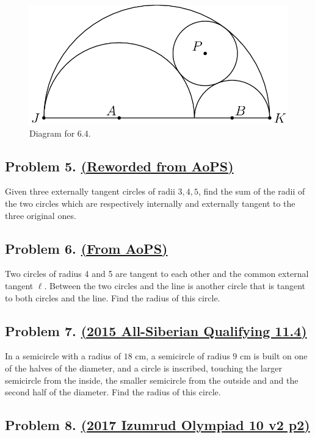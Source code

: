 \documentclass{article}
\begin{document}
\begin{figure}[ht]
\centering
\includegraphics[width=.5\textwidth]{6.4.png}
\caption{Diagram for 6.4.}
\end{figure}


\subsection{Problem 5. \href{https://artofproblemsolving.com/community/c4h1515721}{(Reworded from AoPS)}}

Given three externally tangent circles of radii $3,4,5$, find the sum of the radii of the two circles which are respectively internally and externally tangent to the three original ones.

\subsection{Problem 6. \href{https://artofproblemsolving.com/community/c4h396448}{(From AoPS)}}

Two circles of radius 4 and 5 are tangent to each other and the common external tangent $\ell$. Between the two circles and the line is another circle that is tangent to both circles and the line. Find the radius of this circle.

\subsection{Problem 7. \href{https://artofproblemsolving.com/community/c4h2562133}{(2015 All-Siberian Qualifying 11.4)}}

In a semicircle with a radius of $18$ cm, a semicircle of radius $9$ cm is built on one of the halves of the diameter, and a circle is inscribed, touching the larger semicircle from the inside, the smaller semicircle from the outside and and the second half of the diameter. Find the radius of this circle.

\subsection{Problem 8. \href{https://artofproblemsolving.com/community/c4h2551282}{(2017 Izumrud Olympiad 10 v2 p2)}}
\end{document}
